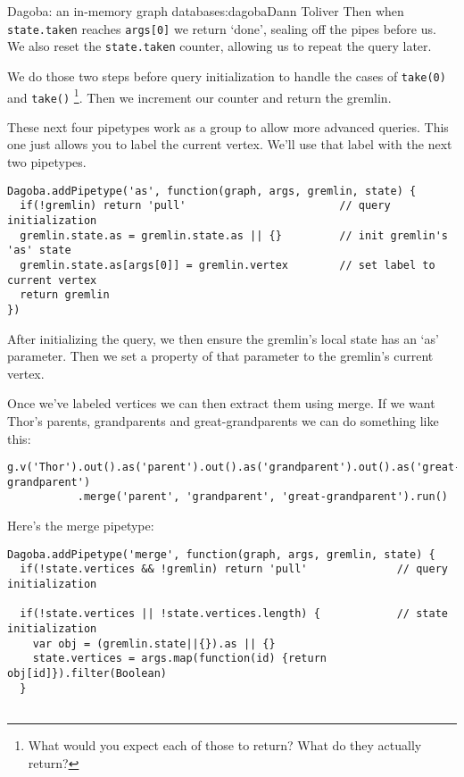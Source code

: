 \begin{aosachapter}{Dagoba: an in-memory graph database}{s:dagoba}{Dann Toliver}
Then when \texttt{state.taken} reaches \texttt{args{[}0{]}} we return
`done', sealing off the pipes before us. We also reset the
\texttt{state.taken} counter, allowing us to repeat the query later.

We do those two steps before query initialization to handle the cases of
\texttt{take(0)} and \texttt{take()} \footnote{What would you expect
  each of those to return? What do they actually return?}. Then we
increment our counter and return the gremlin.

\label{as}

These next four pipetypes work as a group to allow more advanced
queries. This one just allows you to label the current vertex. We'll use
that label with the next two pipetypes.

\begin{verbatim}
Dagoba.addPipetype('as', function(graph, args, gremlin, state) {
  if(!gremlin) return 'pull'                        // query initialization
  gremlin.state.as = gremlin.state.as || {}         // init gremlin's 'as' state
  gremlin.state.as[args[0]] = gremlin.vertex        // set label to current vertex
  return gremlin
})
\end{verbatim}

After initializing the query, we then ensure the gremlin's local state
has an `as' parameter. Then we set a property of that parameter to the
gremlin's current vertex.

\label{merge}

Once we've labeled vertices we can then extract them using merge. If we
want Thor's parents, grandparents and great-grandparents we can do
something like this:

\begin{verbatim}
g.v('Thor').out().as('parent').out().as('grandparent').out().as('great-grandparent')
           .merge('parent', 'grandparent', 'great-grandparent').run()
\end{verbatim}

Here's the merge pipetype:

\begin{verbatim}
Dagoba.addPipetype('merge', function(graph, args, gremlin, state) {
  if(!state.vertices && !gremlin) return 'pull'              // query initialization

  if(!state.vertices || !state.vertices.length) {            // state initialization
    var obj = (gremlin.state||{}).as || {}
    state.vertices = args.map(function(id) {return obj[id]}).filter(Boolean)
  }


\end{verbatim}
\end{aosachapter}
